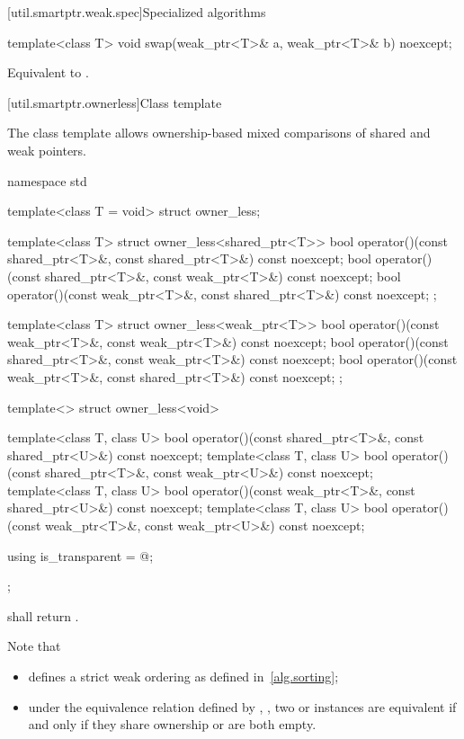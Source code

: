 [util.smartptr.weak.spec]{Specialized algorithms}

%
\begin{itemdecl}
template<class T>
  void swap(weak_ptr<T>& a, weak_ptr<T>& b) noexcept;
\end{itemdecl}

\begin{itemdescr}
\pnum\effects Equivalent to .
\end{itemdescr}

[util.smartptr.ownerless]{Class template }

\pnum
The class template  allows ownership-based mixed comparisons of shared
and weak pointers.

%
\begin{codeblock}
namespace std {
  template<class T = void> struct owner_less;

  template<class T> struct owner_less<shared_ptr<T>> {
    bool operator()(const shared_ptr<T>&, const shared_ptr<T>&) const noexcept;
    bool operator()(const shared_ptr<T>&, const weak_ptr<T>&) const noexcept;
    bool operator()(const weak_ptr<T>&, const shared_ptr<T>&) const noexcept;
  };

  template<class T> struct owner_less<weak_ptr<T>> {
    bool operator()(const weak_ptr<T>&, const weak_ptr<T>&) const noexcept;
    bool operator()(const shared_ptr<T>&, const weak_ptr<T>&) const noexcept;
    bool operator()(const weak_ptr<T>&, const shared_ptr<T>&) const noexcept;
  };

  template<> struct owner_less<void> {
    template<class T, class U>
      bool operator()(const shared_ptr<T>&, const shared_ptr<U>&) const noexcept;
    template<class T, class U>
      bool operator()(const shared_ptr<T>&, const weak_ptr<U>&) const noexcept;
    template<class T, class U>
      bool operator()(const weak_ptr<T>&, const shared_ptr<U>&) const noexcept;
    template<class T, class U>
      bool operator()(const weak_ptr<T>&, const weak_ptr<U>&) const noexcept;

    using is_transparent = @\unspec@;
  };
}
\end{codeblock}

%
\pnum {} shall return . \begin{note}
Note that

\begin{itemize}
\item {} defines a strict weak ordering as defined in~\ref{alg.sorting};

\item under the equivalence relation defined by ,
, two  or
 instances are equivalent if and only if they share ownership or are
both empty.
\end{itemize} \end{note}

